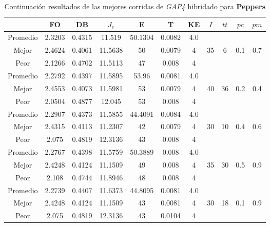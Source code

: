 \begin{table}[h!]
    \footnotesize
    \begin{center}
        \begin{tabular}{|c|c|c|c|c|c|c|c|c|c|c|}
        \hline
             & {\bf FO} & {\bf DB} & $J_e$ & {\bf E} & {\bf T} & {\bf KE} & $I$ & $tt$ & $pc$ & $pm$ \\
        \hline
        \hline
            Promedio  & 2.3203 & 0.4315 & 11.519 & 50.1304 & 0.0082 & 4.0 &  &  &  & \\
            \cline{1-7}
            Mejor & 2.4624 & 0.4061  & 11.5638 & 50 & 0.0079 & 4 & 35 & 6 & 0.1 & 0.7\\
            \cline{1-7}
            Peor & 2.1266 & 0.4702  & 11.5113 & 47 & 0.008 & 4 &  &  &  & \\
        \hline
        \hline
            Promedio  & 2.2792 & 0.4397 & 11.5895 & 53.96 & 0.0081 & 4.0 &  &  &  & \\
            \cline{1-7}
            Mejor & 2.4553 & 0.4073  & 11.5981 & 53 & 0.0079 & 4 & 40 & 36 & 0.2 & 0.4\\
            \cline{1-7}
            Peor & 2.0504 & 0.4877  & 12.045 & 53 & 0.008 & 4 &  &  &  & \\
        \hline
        \hline
            Promedio  & 2.2907 & 0.4373 & 11.5855 & 44.4091 & 0.0084 & 4.0 &  &  &  & \\
            \cline{1-7}
            Mejor & 2.4315 & 0.4113  & 11.2307 & 42 & 0.0079 & 4 & 30 & 10 & 0.4 & 0.6\\
            \cline{1-7}
            Peor & 2.075 & 0.4819  & 12.3136 & 43 & 0.008 & 4 &  &  &  & \\
        \hline
        \hline
            Promedio  & 2.2767 & 0.4398 & 11.5759 & 50.3889 & 0.008 & 4.0 &  &  &  & \\
            \cline{1-7}
            Mejor & 2.4248 & 0.4124  & 11.1509 & 49 & 0.008 & 4 & 35 & 30 & 0.5 & 0.9\\
            \cline{1-7}
            Peor & 2.108 & 0.4744  & 11.8946 & 48 & 0.008 & 4 &  &  &  & \\
        \hline
        \hline
            Promedio  & 2.2739 & 0.4407 & 11.6373 & 44.8095 & 0.0081 & 4.0 &  &  &  & \\
            \cline{1-7}
            Mejor & 2.4248 & 0.4124  & 11.1509 & 43 & 0.0081 & 4 & 30 & 18 & 0.1 & 0.9\\
            \cline{1-7}
            Peor & 2.075 & 0.4819  & 12.3136 & 43 & 0.0104 & 4 &  &  &  & \\
        \hline
        \end{tabular}
        \caption{Continuaci\'on resultados de las mejores corridas de \emph{GAP4} hibridado para {\bf Peppers}}
        \label{tb:tablecGAP4}
    \end{center}
\end{table}
